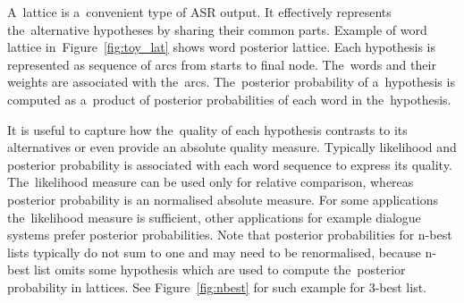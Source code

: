 A~lattice is a~convenient type of \ac{ASR} output.  
It effectively represents the~alternative hypotheses by sharing their common parts.
Example of word lattice in~Figure~\ref{fig:toy_lat} shows word posterior lattice.
Each hypothesis is represented as sequence of arcs from starts to final node.
The~words and their weights are associated with the~arcs.
The~posterior probability of a~hypothesis is computed as a~product of posterior probabilities of each word in the~hypothesis.

It is useful to capture how the~quality of each hypothesis contrasts to its alternatives or even provide an absolute quality measure. 
Typically likelihood and posterior probability is associated with each word sequence to express its quality.
The~likelihood measure can be used only for relative comparison, whereas posterior probability is an normalised absolute measure.
For some applications the~likelihood measure is sufficient, other applications for example dialogue systems prefer posterior probabilities.
Note that posterior probabilities for n-best lists typically do not sum to one and may need to be renormalised, because n-best list omits some hypothesis which are used to compute the~posterior probability in lattices. See Figure~\ref{fig:nbest} for such example for 3-best list.

